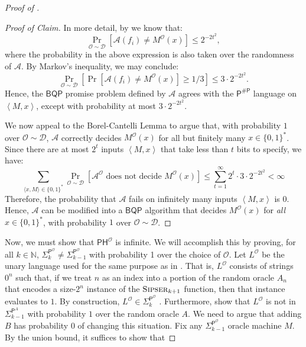 \documentclass[10pt,a4paper]{article}
\newcommand{\Naturals}{\mathbb{N}}
\newcommand{\Sipser}{\normalfont\textsc{Sipser}}
\begin{document}
\begin{proof}[Proof of ]
\begin{proof}[Proof of Claim]
In more detail, by  we know that:
\[
\Pr_{\mathcal{O} \sim \mathcal{D}} \left[\mathcal{A}(f_i) \neq M^\mathcal{O}(x)\right] \le 2^{-2t^2},
\]
where the probability in the above expression is also taken over the randomness of $\mathcal{A}$. By Markov's inequality, we may conclude:
\[
\Pr_{\mathcal{O} \sim \mathcal{D}} \left[\Pr\left[\mathcal{A}(f_i) \neq M^\mathcal{O}(x)\right] \ge 1/3\right] \le 3 \cdot 2^{-2t^2}.
\]
Hence, the $\mathsf{BQP}$ promise problem defined by $\mathcal{A}$ agrees with the $\mathsf{P}^{\mathsf{\# P}}$ language on $\left<M,x\right>$, except with probability at most $3 \cdot 2^{-2t^2}$.

We now appeal to the Borel-Cantelli Lemma to argue that, with probability $1$ over $\mathcal{O} \sim \mathcal{D}$, $\mathcal{A}$ correctly decides $M^\mathcal{O}(x)$ for all but finitely many $x \in \{0,1\}^*$. Since there are at most $2^t$ inputs $\left<M,x\right>$ that take less than $t$ bits to specify, we have:
\[
\sum_{\langle x, M \rangle \in \{0,1\}^*} \Pr_{\mathcal{O} \sim \mathcal{D}}\left[\mathcal{A}^\mathcal{O} \text{ does not decide } M^\mathcal{O}(x)\right] \le \sum_{t=1}^{\infty} 2^t \cdot 3 \cdot 2^{-2t^2} < \infty
\]
Therefore, the probability that $\mathcal{A}$ fails on infinitely many inputs $\left<M,x\right>$ is $0$. Hence, $\mathcal{A}$ can be modified into a $\mathsf{BQP}$ algorithm that decides $M^\mathcal{O}(x)$ for \textit{all} $x \in \{0,1\}^*$, with probability $1$ over $\mathcal{O} \sim \mathcal{D}$.
\end{proof}

Now, we must show that $\mathsf{PH}^\mathcal{O}$ is infinite. We will accomplish this by proving, for all $k \in \Naturals$, $\mathsf{\Sigma}_{k}^{\mathsf{P}^\mathcal{O}}\neq\mathsf{\Sigma}_{k-1}^{\mathsf{P}^\mathcal{O}}$ with probability 1 over the choice of $\mathcal{O}$. Let $L^\mathcal{O}$ be the unary language used for the same purpose as in \cite{RST15,HRST17}. That is, $L^\mathcal{O}$ consists of strings $0^n$ such that, if we treat $n$ as an index into a portion of the random oracle $A_n$ that encodes a size-$2^n$ instance of the $\Sipser_{k+1}$ function, then that instance evaluates to $1$. By construction, $L^\mathcal{O} \in \mathsf{\Sigma}_{k}^{\mathsf{P}^\mathcal{O}}$ \cite{RST15,HRST17}. Furthermore, \cite{RST15,HRST17} show that $L^\mathcal{O}$ is not in $\mathsf{\Sigma}_{k-1}^{\mathsf{P}^A}$ with probability $1$ over the random oracle $A$. We need to argue that adding $B$ has probability $0$ of changing this situation. Fix any $\mathsf{\Sigma}_{k-1}^{\mathsf{P}^\mathcal{O}}$ oracle machine $M$. By the union bound, it suffices to show that


\end{proof}
\end{document}
